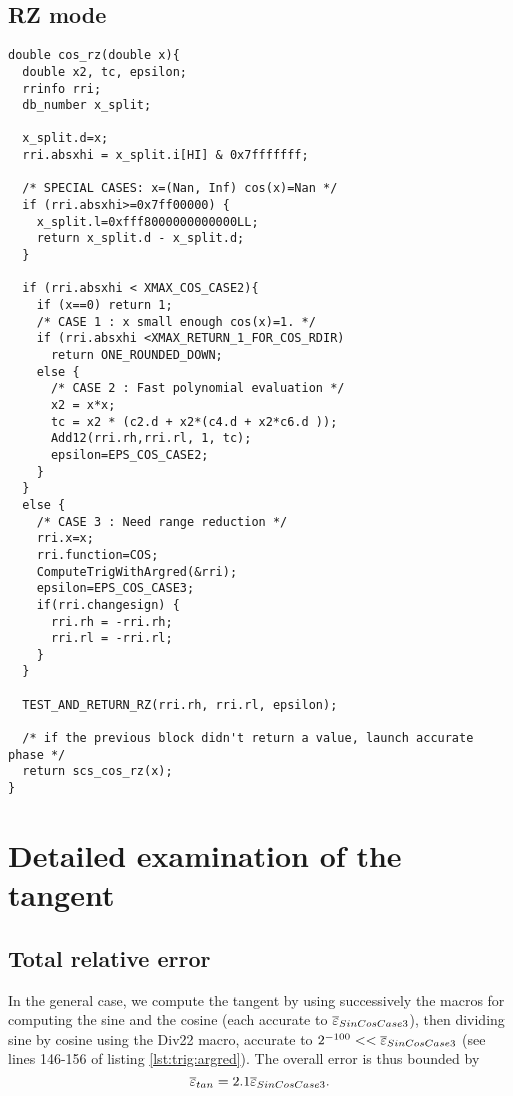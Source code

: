 \subsection{RZ mode}
\begin{lstlisting}[caption={Exceptional cases for cosine RZ},firstnumber=1]
double cos_rz(double x){
  double x2, tc, epsilon;
  rrinfo rri;
  db_number x_split;

  x_split.d=x;
  rri.absxhi = x_split.i[HI] & 0x7fffffff;

  /* SPECIAL CASES: x=(Nan, Inf) cos(x)=Nan */
  if (rri.absxhi>=0x7ff00000) {
    x_split.l=0xfff8000000000000LL;
    return x_split.d - x_split.d;
  }

  if (rri.absxhi < XMAX_COS_CASE2){
    if (x==0) return 1;
    /* CASE 1 : x small enough cos(x)=1. */
    if (rri.absxhi <XMAX_RETURN_1_FOR_COS_RDIR)
      return ONE_ROUNDED_DOWN;
    else {
      /* CASE 2 : Fast polynomial evaluation */
      x2 = x*x;
      tc = x2 * (c2.d + x2*(c4.d + x2*c6.d ));
      Add12(rri.rh,rri.rl, 1, tc);
      epsilon=EPS_COS_CASE2;
    }
  }
  else {
    /* CASE 3 : Need range reduction */
    rri.x=x;
    rri.function=COS;
    ComputeTrigWithArgred(&rri);
    epsilon=EPS_COS_CASE3;
    if(rri.changesign) {
      rri.rh = -rri.rh;
      rri.rl = -rri.rl;
    }
  }

  TEST_AND_RETURN_RZ(rri.rh, rri.rl, epsilon);

  /* if the previous block didn't return a value, launch accurate phase */
  return scs_cos_rz(x);
}
\end{lstlisting}

\section{Detailed examination of the tangent}

\subsection{Total relative error}
In the general case, we compute the tangent by using successively the
macros for computing the sine and the cosine (each accurate to
${\overline{\varepsilon}}_{SinCosCase3}$), then dividing sine by cosine using the Div22
macro, accurate to $2^{-100}<<{\overline{\varepsilon}}_{SinCosCase3}$ (see lines 146-156
of listing \ref{lst:trig:argred}). The overall error is thus bounded
by $${\overline{\varepsilon}}_{tan} = 2.1{\overline{\varepsilon}}_{SinCosCase3} .$$


